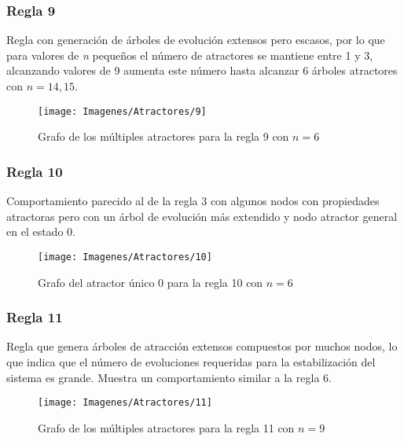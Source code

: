 \documentclass[]{article}
\begin{document}
			
			\newpage
			\subsubsection{Regla 9}
				\justifying
				Regla con generación de árboles de evolución extensos pero escasos, por lo que para valores de \textit{n} pequeños el número de atractores se mantiene entre 1 y 3, alcanzando valores de 9 aumenta este número hasta alcanzar 6 árboles atractores con $n=14,15$.
				
				
				\hfill\break
				\hfill\break
				\begin{figure}[!h]
					\centering
					\texttt{[image: Imagenes/Atractores/9]}
					\caption{Grafo de los múltiples atractores para la regla 9 con $n=6$}
					\label{Regla_9}
				\end{figure}
				
			
			\newpage
			\subsubsection{Regla 10}
				\justifying					
				Comportamiento parecido al de la regla 3 con algunos nodos con propiedades atractoras pero con un árbol de evolución más extendido y nodo atractor general en el estado 0.
				
				
				\hfill\break
				\hfill\break
				\begin{figure}[!h]
					\centering
					\texttt{[image: Imagenes/Atractores/10]}
					\caption{Grafo del atractor único 0 para la regla 10 con $n=6$}
					\label{Regla_10}
				\end{figure}
			
			
			\newpage
			\subsubsection{Regla 11}
				\justifying	
				Regla que genera árboles de atracción extensos compuestos por muchos nodos, lo que indica que el número de evoluciones requeridas para la estabilización del sistema es grande. Muestra un comportamiento similar a la regla 6.
				
				
				\hfill\break
				\hfill\break
				\hfill\break
				\begin{figure}[!h]
					\centering
					\texttt{[image: Imagenes/Atractores/11]}
					\caption{Grafo de los múltiples atractores para la regla 11 con $n=9$}
					\label{Regla_11}
				\end{figure}
				
\end{document}
